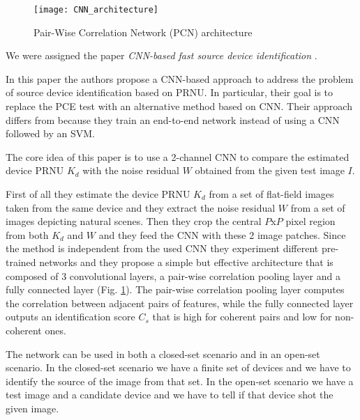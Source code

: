 \begin{figure}[ht!]
    \centering
    \texttt{[image: CNN\_architecture]}
    \caption{Pair-Wise Correlation Network (PCN) architecture}
    \label{fig:CNN_architecture}
\end{figure}

We were assigned the paper \textit{CNN-based fast source device identification} \cite{Mandelli}.

In this paper the authors propose a CNN-based approach to address the problem of source device identification based on PRNU. 
In particular, their goal is to replace the PCE test with an alternative method based on CNN. Their approach differs from \cite{Bondi}
because they train an end-to-end network instead of using a CNN followed by an SVM.

The core idea of this paper is to use a 2-channel CNN to compare the estimated device PRNU $K_d$ with the noise residual $W$ 
obtained from the given test image $I$.

First of all they estimate the device PRNU\cite{Lukas} $K_d$ from a set of flat-field images taken from the same device and they extract the
noise residual $W$ from a set of images depicting natural scenes.
Then they crop the central $P$x$P$ pixel region from both $K_d$ and $W$ and they feed the CNN with these 2 image patches.
Since the method is independent from the used CNN they experiment different pre-trained networks and they propose a simple but 
effective architecture that is composed of 3 convolutional layers, a pair-wise correlation pooling layer and a fully connected 
layer (Fig. \ref{fig:CNN_architecture}). The pair-wise correlation pooling layer computes the correlation between adjacent pairs of features, while the
fully connected layer outputs an identification score $C_s$ that is high for coherent pairs and low for non-coherent ones. 

The network can be used in both a closed-set scenario and in an open-set scenario. In the closed-set scenario we have a finite set 
of devices and we have to identify the source of the image from that set. In the open-set scenario we have a test image and a candidate
device and we have to tell if that device shot the given image.


